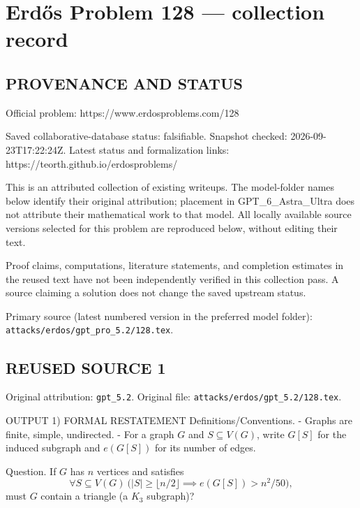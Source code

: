 \section*{Erd\H{o}s Problem 128 --- collection record}

\subsection*{PROVENANCE AND STATUS}
Official problem: https://www.erdosproblems.com/128

Saved collaborative-database status: falsifiable.
Snapshot checked: 2026-09-23T17:22:24Z.
Latest status and formalization links: https://teorth.github.io/erdosproblems/

This is an attributed collection of existing writeups. The model-folder names below identify their original attribution; placement in GPT\_6\_Astra\_Ultra does not attribute their mathematical work to that model. All locally available source versions selected for this problem are reproduced below, without editing their text.

Proof claims, computations, literature statements, and completion estimates in the reused text have not been independently verified in this collection pass. A source claiming a solution does not change the saved upstream status.

Primary source (latest numbered version in the preferred model folder): \texttt{attacks/erdos/gpt\_pro\_5.2/128.tex}.

\subsection*{REUSED SOURCE 1}
Original attribution: \texttt{gpt\_5.2}.
Original file: \texttt{attacks/erdos/gpt\_5.2/128.tex}.


OUTPUT
1) FORMAL RESTATEMENT
Definitions/Conventions.
- Graphs are finite, simple, undirected.
- For a graph $G$ and $S\subseteq V(G)$, write $G[S]$ for the induced subgraph and $e(G[S])$ for its number of edges.

Question.
If $G$ has $n$ vertices and satisfies
\[\forall S\subseteq V(G)\ \big(|S|\ge \lfloor n/2\rfloor \implies e(G[S])> n^2/50\big),\]
must $G$ contain a triangle (a $K_3$ subgraph)?


